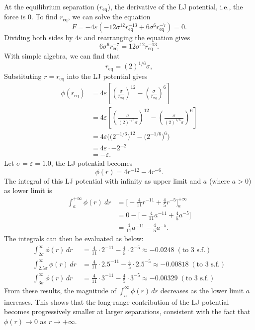 \documentclass[a4paper,10pt,twocolumn]{article}
\begin{document}
At the equilibrium separation ($r_{\mathrm{eq}}$), the derivative of the LJ potential, i.e., the force is 0. To find $r_{\mathrm{eq}}$, we can solve the equation 
\[
F=-4\varepsilon\left(-12\sigma^{12}r_{\mathrm{eq}}^{-13}+6\sigma^{6}r_{\mathrm{eq}}^{-7} \right)=0.
\]
Dividing both sides by $4\varepsilon$ and rearranging the equation gives
\[
6\sigma^{6}r_{\mathrm{eq}}^{-7}=12\sigma^{12}r_{\mathrm{eq}}^{-13}.
\]
With simple algebra, we can find that
\[
r_{\mathrm{eq}}=(2)^{1/6}\sigma,
\]
Substituting $r=r_{\mathrm{\mathrm{eq}}}$ into the LJ potential gives
\begin{align*}
\phi(r_{\mathrm{eq}})
&= 4\varepsilon\left[\left(\frac{\sigma}{r_{\mathrm{eq}}}\right)^{12}-\left(\frac{\sigma}{r_{\mathrm{eq}}}\right)^6\right]
\\
&= 4\varepsilon\left[\left(\frac{\sigma}{(2)^{1/6}\sigma}\right)^{12}-\left(\frac{\sigma}{(2)^{1/6}\sigma}\right)^6\right]
\\
&= 4\varepsilon\Big(\big(2^{-1/6}\big)^{12}-\big(2^{-1/6}\big)^{6}\Big)
\\
&= 4\varepsilon\cdot-2^{-2}
\\
&= -\varepsilon.
\end{align*}
Let $\sigma=\varepsilon=1.0$, the LJ potential becomes
\[
\phi(r)=4r^{-12}-4r^{-6}.
\]
The integral of this LJ potential with infinity as upper limit and $a$ (where $a>0$) as lower limit is
\begin{align*}
\int^{+\infty}_{a} \phi(r)\ dr
&= \Big[-\frac{4}{11}r^{-11}+\frac{4}{5}r^{-5}\Big]^{+\infty}_{a}
\\
&= 0-\Big[-\frac{4}{11}a^{-11}+\frac{4}{5}a^{-5}\Big]
\\
&= \frac{4}{11}a^{-11}-\frac{4}{5}a^{-5}.
\end{align*}
The integrals can then be evaluated as below:
\begin{align*}
\int_{2\sigma}^{\infty}\phi(r)\,dr
&= \frac{4}{11}\cdot2^{-11}-\frac{4}{5}\cdot2^{-5}
\approx -0.0248 \; (\text{to 3 s.f.}) \\
\int_{2.5\sigma}^{\infty}\phi(r)\,dr
&= \frac{4}{11}\cdot2.5^{-11}-\frac{4}{5}\cdot2.5^{-5}
\approx -0.00818 \; (\text{to 3 s.f.}) \\
\int_{3\sigma}^{\infty}\phi(r)\,dr
&= \frac{4}{11}\cdot3^{-11}-\frac{4}{5}\cdot3^{-5}
\approx -0.00329 \; (\text{to 3 s.f.})
\end{align*}
From these results, the magnitude of $\int_{a}^{\infty}\phi(r)\,dr$ decreases as the lower limit $a$ increases. This shows that the long-range contribution of the LJ potential becomes progressively smaller at larger separations, consistent with the fact that $\phi(r)\to 0$ as $r\to+\infty$.
\end{document}
